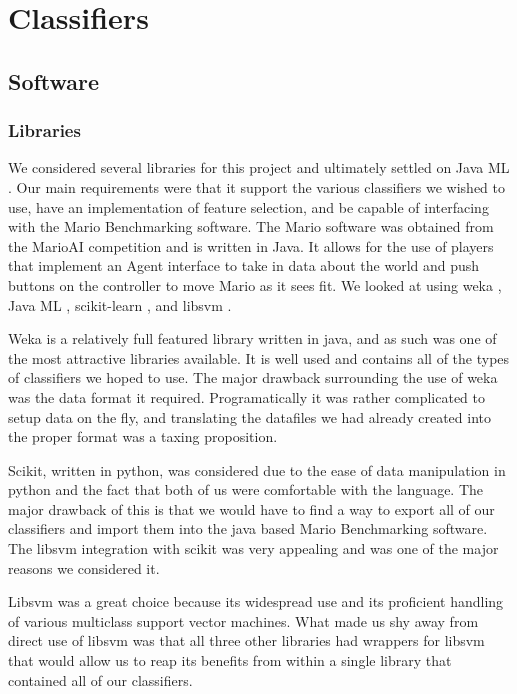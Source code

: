 \documentclass[]{article}   %
\begin{document}
\section{Classifiers}
\subsection{Software}
\subsubsection{Libraries}
We considered several libraries for this project and ultimately settled on Java ML \cite{javaml}. Our main 
requirements were that it support the various classifiers we wished to use, have an implementation of feature 
selection, and be capable of interfacing with the Mario Benchmarking \cite{mariobenchmark} software. The 
Mario software was obtained from the MarioAI competition and is written in Java. It allows for the use of 
players that implement an Agent interface to take in data about the world and push buttons on the controller 
to move Mario as it sees fit. We looked at using weka \cite{weka}, Java ML \cite{javaml}, scikit-learn 
\cite{scikit}, and libsvm \cite{libsvm}. 

Weka is a relatively full featured library written in java, and as such was one of the most attractive libraries 
available. It is well used and contains all of the types of classifiers we hoped to use. The major drawback 
surrounding the use of weka was the data format it required. Programatically it was rather complicated to setup 
data on the fly, and translating the datafiles we had already created into the proper format was a taxing proposition. 

Scikit, written in python, was considered due to the ease of data manipulation in python and the fact that both 
of us were comfortable with the language. The major drawback of this is that we would have to find a way to 
export all of our classifiers and import them into the java based Mario Benchmarking software. The libsvm 
integration with scikit was very appealing and was one of the major reasons we considered it.

Libsvm was a great choice because its widespread use and its proficient handling of various multiclass support 
vector machines. What made us shy away from direct use of libsvm was that all three other libraries had wrappers 
for libsvm that would allow us to reap its benefits from within a single library that contained all of our classifiers.
\end{document}
